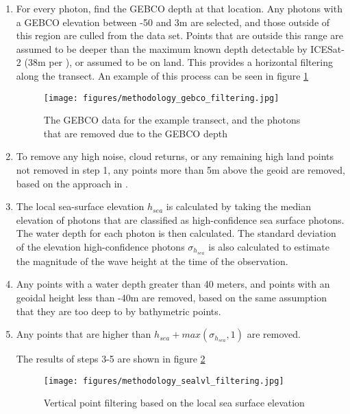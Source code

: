 \begin{enumerate}
    \item For every photon, find the GEBCO depth at that location. Any photons with a GEBCO elevation between -50 and 3m are selected, and those outside of this region are culled from the data set. Points that are outside this range are assumed to be deeper than the maximum known depth detectable by ICESat-2 (38m per \citeauthor{Parrish2019}), or assumed to be on land. This provides a horizontal filtering along the transect. An example of this process can be seen in figure \ref{fig:gebco_filtering}
    
    \begin{figure}[h!]
        \centering
        \texttt{[image: figures/methodology\_gebco\_filtering.jpg]}
        \caption{The GEBCO data for the example transect, and the photons that are removed due to the GEBCO depth}
        \label{fig:gebco_filtering}
    \end{figure}

    \item To remove any high noise, cloud returns, or any remaining high land points not removed in step 1, any points more than 5m above the geoid are removed, based on the approach in \citeauthor{Ranndal2021}.
    \item The local sea-surface elevation $h_{sea}$ is calculated by taking the median elevation of photons that are classified as high-confidence sea surface photons. The water depth for each photon is then calculated. The standard deviation of the elevation high-confidence photons $\sigma_{h_{sea}}$ is also calculated to estimate the magnitude of the wave height at the time of the observation.
    \item Any points with a water depth greater than 40 meters, and points with an geoidal height  less than -40m are removed, based on the same assumption that they are too deep to by bathymetric points. 
    \item Any points that are higher than $h_{sea} + max(\sigma_{h_{sea}},1)$ are removed. 
    
    
    The results of steps 3-5  are shown in figure \ref{fig:vert_filtering}
    \begin{figure}[h!]
        \centering
        \texttt{[image: figures/methodology\_sealvl\_filtering.jpg]}
        \caption{Vertical point filtering based on the local sea surface elevation}
        \label{fig:vert_filtering}
    \end{figure}
\end{enumerate}


